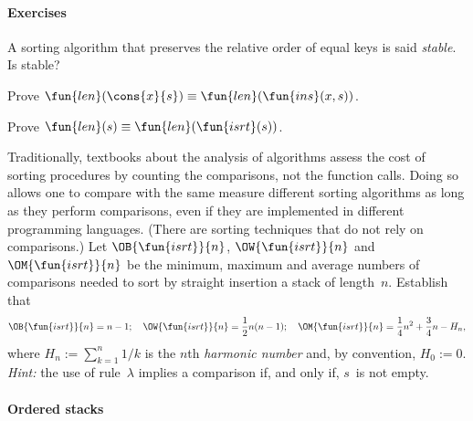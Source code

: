 \paragraph{Exercises}
\begin{enumerate*}

  \item A sorting algorithm that preserves the relative order of equal
    keys is said \emph{stable}. Is
     stable?

  \item Prove \(\fun{len}(\cons{x}{s}) \equiv
    \fun{len}(\fun{ins}(x,s))\).

  \item Prove \(\fun{len}(s) \equiv \fun{len}(\fun{isrt}(s))\).

  \item Traditionally, textbooks about the analysis of algorithms
    assess the cost of sorting procedures by counting the comparisons,
    not the function calls. Doing so allows one to compare with the
    same measure different sorting algorithms as long as they perform
    comparisons, even if they are implemented in different programming
    languages. (There are sorting techniques that do not rely on
    comparisons.) Let
    \(\OB{\fun{isrt}}{n}\),
    \(\OW{\fun{isrt}}{n}\) and
    \(\OM{\fun{isrt}}{n}\) be the
    minimum, maximum and average numbers of comparisons needed to sort
    by straight insertion a stack of length~\(n\). Establish that
    \begin{equation*}
      \OB{\fun{isrt}}{n} = n - 1; \quad
      \OW{\fun{isrt}}{n} = \frac{1}{2}n(n - 1); \quad
      \OM{\fun{isrt}}{n} = \frac{1}{4}n^2 + \frac{3}{4}n - H_n,
    \end{equation*}
    where \(H_n := \sum_{k=1}^n{1/k}\) is the \(n\)th \emph{harmonic
      number} and, by convention, \(H_0 :=
    0\). \emph{Hint:} the use of rule~\(\lambda\) implies a comparison
    if, and only if, \(s\)~is not empty.

\end{enumerate*}

\paragraph{Ordered stacks}

